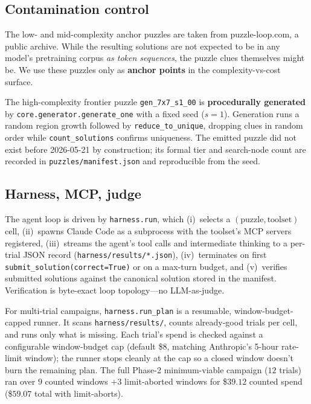 \documentclass[11pt,letterpaper]{article}
\begin{document}
\subsection{Contamination control}

The low- and mid-complexity anchor puzzles are taken from
puzzle-loop.com, a public archive. While the resulting solutions
are not expected to be in any model's pretraining corpus
\emph{as token sequences}, the puzzle clues themselves might be.
We use these puzzles only as \textbf{anchor points} in the
complexity-vs-cost surface.

The high-complexity frontier puzzle \texttt{gen\_7x7\_s1\_00} is
\textbf{procedurally generated} by
\texttt{core.generator.generate\_one} with a fixed seed ($s = 1$).
Generation runs a random region growth followed by
\texttt{reduce\_to\_unique}, dropping clues in random order while
\texttt{count\_solutions} confirms uniqueness. The emitted puzzle
did not exist before 2026-05-21 by construction; its formal tier
and search-node count are recorded in
\texttt{puzzles/manifest.json} and reproducible from the seed.

\subsection{Harness, MCP, judge}

The agent loop is driven by \texttt{harness.run}, which (i)~selects
a $(\text{puzzle}, \text{toolset})$ cell, (ii)~spawns Claude Code
as a subprocess with the toolset's MCP servers registered,
(iii)~streams the agent's tool calls and intermediate thinking to a
per-trial JSON record (\texttt{harness/results/*.json}),
(iv)~terminates on first
\texttt{submit\_solution(correct=True)} or on a max-turn budget,
and (v)~verifies submitted solutions against the canonical
solution stored in the manifest. Verification is byte-exact loop
topology---no LLM-as-judge.

For multi-trial campaigns, \texttt{harness.run\_plan} is a
resumable, window-budget-capped runner. It scans
\texttt{harness/results/}, counts already-good trials per cell,
and runs only what is missing. Each trial's spend is checked
against a configurable window-budget cap (default \$$8$, matching
Anthropic's 5-hour rate-limit window); the runner stops cleanly at
the cap so a closed window doesn't burn the remaining plan. The
full Phase-2 minimum-viable campaign ($12$ trials) ran over $9$
counted windows $+ 3$ limit-aborted windows for \$$39.12$ counted
spend (\$$59.07$ total with limit-aborts).
\end{document}
